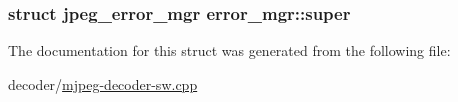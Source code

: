 \subsubsection[{\texorpdfstring{super}{super}}]{\setlength{\rightskip}{0pt plus 5cm}struct jpeg\+\_\+error\+\_\+mgr error\+\_\+mgr\+::super}\hypertarget{structerror__mgr_a05d0382955eda152db1b6fa9ff3a3d6e}{}\label{structerror__mgr_a05d0382955eda152db1b6fa9ff3a3d6e}


The documentation for this struct was generated from the following file\+:\begin{DoxyCompactItemize}
\item 
decoder/\hyperlink{mjpeg-decoder-sw_8cpp}{mjpeg-\/decoder-\/sw.\+cpp}\end{DoxyCompactItemize}
